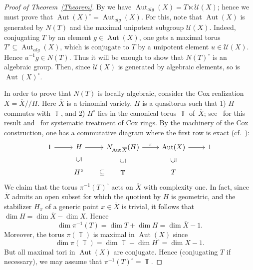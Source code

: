\documentclass[a4paper,reqno,12pt]{amsart}
\theoremstyle{theorem}
\newtheorem{theorem}{Theorem}[section]
\theoremstyle{definition}
\theoremstyle{theorem}
\theoremstyle{remark}
\DeclareMathOperator{\Aut}{Aut}
\DeclareMathOperator{\TT}{\mathbb T}
\newcommand{\UU}{\mathcal U}
\newcommand{\HH}{\mathbb H}
\newcommand{\0}{\circ}
\begin{document}
\begin{proof}[Proof of Theorem~\ref{Theorem}]
    
    By \cite[Theorem 1.3 and Lemma 2.2]{PR23} we have $\Aut_{alg}(X)=T\ltimes\UU(X)$; hence we must prove that $\Aut(X)^\circ = \Aut_{alg}(X)$. For this, note that $\Aut(X)$ is generated by $N(T)$ and the maximal unipotent subgroup $\mathcal U(X)$. Indeed, conjugating $T$ by an element $g\in\Aut(X)$, one gets a maximal torus $T'\subseteq \Aut_{alg}(X)$, which is conjugate to $T$ by a unipotent element $u\in \mathcal U(X)$. Hence $u^{-1}g\in N(T)$. Thus it will be enough to show that $N(T)^\circ$ is an algebraic group. Then, since $\mathcal U(X)$ is generated by algebraic elements, so is $\Aut(X)^\circ$.

    In order to prove that $N(T)$ is locally algebraic, consider the Cox realization $X=\overline X /\!/H$. Here $\overline X$ is a trinomial variety, $H$  
    is a quasitorus such that 1) $H$ commutes with $\TT$, and 2) $H^\0$ lies in the canonical torus $\TT$ of~$\overline X$; see~\cite{HW} for this result and~\cite{ADHL} for systematic treatment of Cox rings. By the machinery of the Cox construction, one has a commutative diagram where the first row is exact (cf.~\cite[Theorem 5.1]{AG10}):
    $$
    \begin{tikzcd}
        1 \arrow[r] & H \arrow[r] &N_{\Aut\overline X}(H) \arrow[r, "\pi"] &\Aut(X) \arrow[r] &1\\
        & H^\circ \arrow[u, phantom, sloped, "\subseteq"]\arrow[r, phantom, sloped, "\subseteq"] &\TT \arrow[u, phantom, sloped, "\subseteq"] &T \arrow[u, phantom, sloped, "\subseteq"]
    \end{tikzcd}          
    $$
    We claim that the torus $\pi^{-1}(T)^\circ$ acts on $\overline X$ with complexity one. In fact, since $\overline X$ admits an open subset for which the quotient by $H$ is geometric, and the stabilizer $H_x$ of a generic point $x\in\overline X$ is trivial, it follows that $\dim H=\dim\overline X - \dim X$. Hence 
    $$\dim \pi^{-1}(T) = \dim T +\dim H = \dim\overline X -1.$$
    Moreover, the torus $\pi(\TT)$ is maximal in $\Aut(X)$ since 
    $$\dim\pi(\TT)=\dim \TT-\dim H^\0 = \dim X-1.$$
    But all maximal tori in $\Aut(X)$ are conjugate. Hence (conjugating $T$ if necessary), we may assume that $\pi^{-1}(T)^\circ=\TT$.


\end{proof}
\end{document}
